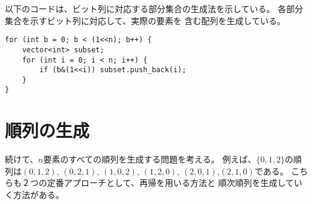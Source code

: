 以下のコードは、ビット列に対応する部分集合の生成法を示している。
各部分集合を示すビット列に対応して、実際の要素を
含む配列を生成している。

\begin{lstlisting}
for (int b = 0; b < (1<<n); b++) {
    vector<int> subset;
    for (int i = 0; i < n; i++) {
        if (b&(1<<i)) subset.push_back(i);
    }
}
\end{lstlisting}

\begin{comment}
\section{Generating permutations}

\index{permutation}

Next we consider the problem of generating
all permutations of a set of $n$ elements.
For example, the permutations of $\{0,1,2\}$ are
$(0,1,2)$, $(0,2,1)$, $(1,0,2)$, $(1,2,0)$,
$(2,0,1)$ and $(2,1,0)$.
Again, there are two approaches:
we can either use recursion or go through the
permutations iteratively.

\end{comment}

\section{順列の生成}


続けて、$n$要素のすべての順列を生成する問題を考える。
例えば、$\{0,1,2\}$の順列は$(0,1,2)$, $(0,2,1)$, $(1,0,2)$, $(1,2,0)$,
$(2,0,1)$,$(2,1,0)$である。
こちらも２つの定番アプローチとして、再帰を用いる方法と
順次順列を生成していく方法がある。

\begin{comment}
\subsubsection{Method 1}

Like subsets, permutations can be generated
using recursion.
The following function \texttt{search} goes
through the permutations of the set $\{0,1,\ldots,n-1\}$.
The function builds a vector \texttt{permutation}
that contains the permutation,
and the search begins when the function is
called without parameters.

\begin{lstlisting}
void search() {
    if (permutation.size() == n) {
        // process permutation
    } else {
        for (int i = 0; i < n; i++) {
            if (chosen[i]) continue;
            chosen[i] = true;
            permutation.push_back(i);
            search();
            chosen[i] = false;
            permutation.pop_back();
        }
    }
}
\end{lstlisting}
\end{comment}

